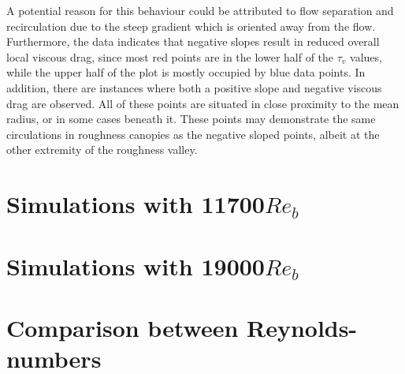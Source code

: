 A potential reason for this behaviour could be attributed to flow separation and recirculation due to the steep gradient which is oriented away from the flow.
Furthermore, the data indicates that negative slopes result in reduced overall  local viscous drag, since most red points are in the lower half of the $\tau_v$ values, while the upper half of the plot is mostly occupied by blue data points.
In addition, there are instances where both a positive slope and negative viscous drag are observed. 
All of these points are situated in close proximity to  the mean radius, or in some cases beneath it.
These points may demonstrate the same circulations in roughness canopies as the negative sloped points, albeit at the other extremity of the roughness valley.

\section{Simulations with 11700$Re_b$}

\section{Simulations with 19000$Re_b$}

\section{Comparison between Reynolds-numbers}